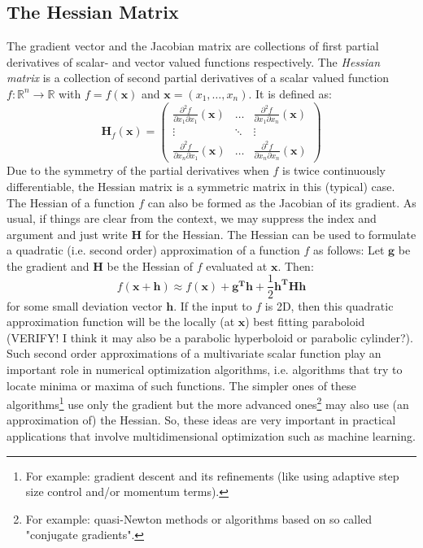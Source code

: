 \subsection{The Hessian Matrix}
The gradient vector and the Jacobian matrix are collections of first partial derivatives of scalar- and vector valued functions respectively. The \emph{Hessian matrix} is a collection of second partial derivatives of a scalar valued function $f: \mathbb{R}^n \rightarrow \mathbb{R}$ with $f = f(\mathbf{x})$ and $\mathbf{x} = (x_1, \ldots, x_n)$. It is defined as:
\begin{equation}
 \mathbf{H}_f(\mathbf{x}) = 
	\begin{pmatrix}
		  \frac{\partial^2 f}{\partial x_1 \partial x_1} (\mathbf{x}) 
		& \hdots 
		& \frac{\partial^2 f}{\partial x_1 \partial x_n} (\mathbf{x}) 
		\\
		\vdots & \ddots & \vdots 
		\\
	      \frac{\partial^2 f}{\partial x_n \partial x_1} (\mathbf{x}) 
		& \hdots 
		& \frac{\partial^2 f}{\partial x_n \partial x_n} (\mathbf{x})
	\end{pmatrix}
\end{equation}	
Due to the symmetry of the partial derivatives when $f$ is twice continuously differentiable, the Hessian matrix is a symmetric matrix in this (typical) case. The Hessian of a function $f$ can also be formed as the Jacobian of its gradient. As usual, if things are clear from the context, we may suppress the index and argument and just write $\mathbf{H}$ for the Hessian. The Hessian can be used to formulate a quadratic (i.e. second order) approximation of a function $f$ as follows: Let $\mathbf{g}$ be the gradient and $\mathbf{H}$ be the Hessian of $f$ evaluated at $\mathbf{x}$. Then:
\begin{equation}
\label{Eq:TaylorMultivariate2ndOrder}
 f(\mathbf{x + h}) \approx f(\mathbf{x}) + \mathbf{g^T h} + \frac{1}{2} \mathbf{h^T H h}
\end{equation}	
for some small deviation vector $\mathbf{h}$. If the input to $f$ is 2D, then this quadratic approximation function will be the locally (at $\mathbf{x}$) best fitting paraboloid (VERIFY! I think it may also be a parabolic hyperboloid or parabolic cylinder?). Such second order approximations of a multivariate scalar function play an important role in numerical optimization algorithms, i.e. algorithms that try to locate minima or maxima of such functions. The simpler ones of these algorithms\footnote{For example: gradient descent and its refinements (like using adaptive step size control and/or momentum terms).} use only the gradient but the more advanced ones\footnote{For example: quasi-Newton methods or algorithms based on so called "conjugate gradients".} may also use (an approximation of) the Hessian. So, these ideas are very important in practical applications that involve multidimensional optimization such as machine learning.

